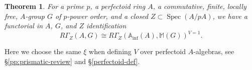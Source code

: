 \documentclass[11pt, reqno]{amsart}
\newcommand{\bA}{\mathbb{A}}
\newcommand{\bM}{\mathbb{M}}
\DeclareMathOperator{\Spec}{Spec}		%
\newcommand{\Inf}{\mathrm{inf}}		%
\providecommand{\uref}[1]{{\upshape\ref{#1}}}
\providecommand{\uS}{{\upshape\S}}
\newcommand{\be}{\begin{equation}}
\newcommand{\ee}{\end{equation}}
\numberwithin{equation}{numberingbase}
\theoremstyle{thms}
\newtheorem{theorem}[numberingbase]{Theorem}
\theoremstyle{claims}
\theoremstyle{defs}
\theoremstyle{thms}
\theoremstyle{defs}
\theoremstyle{subsection-tweak}
\theoremstyle{subsection-tweak}
\begin{document}

 







\begin{theorem}\label{thm:perfectoidsupport}  
For a prime $p$, a perfectoid ring $A$, a commutative, finite, locally free, $A$-group $G$ of $p$-power order, and a closed $Z\subset \Spec (A/pA)$, we have a functorial in $A$, $G$, and $Z$ identification
\be \label{eqn:key-formula-pf}
R\Gamma_Z(A,G)\cong R\Gamma_{Z}(\bA_\Inf(A), \bM(G))^{V = 1}.
\ee
\end{theorem}

Here we choose the same $\xi$ when defining $V$ over perfectoid $A$-algebras, see \uS\uref{pp:prismatic-review} and \uS\uref{perfectoid-def}.
\end{document}
